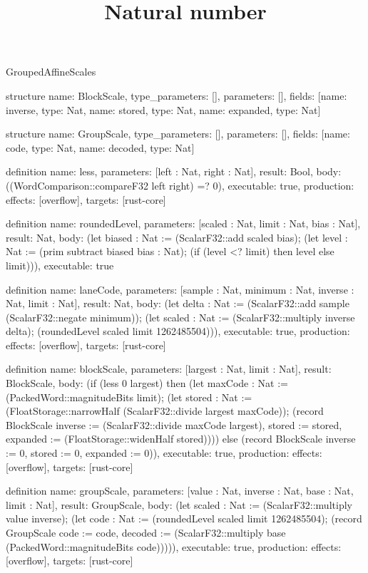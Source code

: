 \begin{lexlean}{GroupedAffineScales}
\title{Natural number}
\begin{semanticmodule}
structure{
  name: BlockScale,
  type_parameters: [],
  parameters: [],
  fields: [{name: inverse, type: Nat}, {name: stored, type: Nat}, {name: expanded, type: Nat}]
}

structure{
  name: GroupScale,
  type_parameters: [],
  parameters: [],
  fields: [{name: code, type: Nat}, {name: decoded, type: Nat}]
}

definition{
  name: less,
  parameters: [left : Nat, right : Nat],
  result: Bool,
  body: ((WordComparison::compareF32 left right) =? 0),
  executable: true,
  production: {effects: [overflow], targets: [rust-core]}
}

definition{
  name: roundedLevel,
  parameters: [scaled : Nat, limit : Nat, bias : Nat],
  result: Nat,
  body: (let biased : Nat := (ScalarF32::add scaled bias); (let level : Nat := (prim subtract biased bias : Nat); (if (level <? limit) then level else limit))),
  executable: true
}

definition{
  name: laneCode,
  parameters: [sample : Nat, minimum : Nat, inverse : Nat, limit : Nat],
  result: Nat,
  body: (let delta : Nat := (ScalarF32::add sample (ScalarF32::negate minimum)); (let scaled : Nat := (ScalarF32::multiply inverse delta); (roundedLevel scaled limit 1262485504))),
  executable: true,
  production: {effects: [overflow], targets: [rust-core]}
}

definition{
  name: blockScale,
  parameters: [largest : Nat, limit : Nat],
  result: BlockScale,
  body: (if (less 0 largest) then (let maxCode : Nat := (PackedWord::magnitudeBits limit); (let stored : Nat := (FloatStorage::narrowHalf (ScalarF32::divide largest maxCode)); (record BlockScale {inverse := (ScalarF32::divide maxCode largest), stored := stored, expanded := (FloatStorage::widenHalf stored)}))) else (record BlockScale {inverse := 0, stored := 0, expanded := 0})),
  executable: true,
  production: {effects: [overflow], targets: [rust-core]}
}

definition{
  name: groupScale,
  parameters: [value : Nat, inverse : Nat, base : Nat, limit : Nat],
  result: GroupScale,
  body: (let scaled : Nat := (ScalarF32::multiply value inverse); (let code : Nat := (roundedLevel scaled limit 1262485504); (record GroupScale {code := code, decoded := (ScalarF32::multiply base (PackedWord::magnitudeBits code))}))),
  executable: true,
  production: {effects: [overflow], targets: [rust-core]}
}
\end{semanticmodule}
\end{lexlean}
